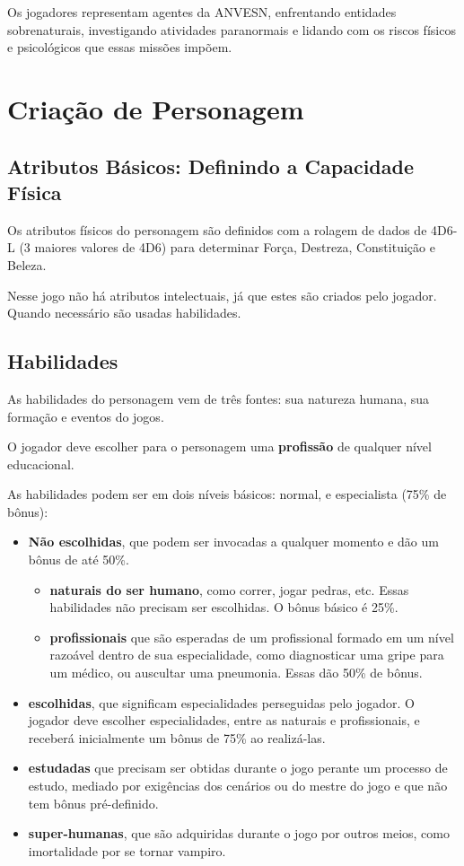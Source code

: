 \documentclass[a4paper,12pt]{book}
\begin{document}
Os jogadores representam agentes da ANVESN, enfrentando entidades sobrenaturais, investigando atividades paranormais e lidando com os riscos físicos e psicológicos que essas missões impõem.

\chapter{Criação de Personagem}

\section{Atributos Básicos: Definindo a Capacidade Física}

Os atributos físicos do personagem são definidos com a rolagem de dados de 4D6-L (3 maiores valores de 4D6) para determinar Força, Destreza, Constituição e Beleza.

Nesse jogo não há atributos intelectuais, já que estes são criados pelo jogador. Quando necessário são usadas habilidades.

\section{Habilidades}

As habilidades do personagem vem de três fontes: sua natureza humana, sua formação e eventos do jogos.

O jogador deve escolher para o personagem uma \textbf{profissão} de qualquer nível educacional.


As habilidades podem ser em dois níveis básicos: normal,   e especialista (75\% de bônus):

\begin{itemize}
\item \textbf{Não escolhidas}, que podem ser invocadas a qualquer momento e dão um bônus de até 50\%.
\begin{itemize}
\item \textbf{naturais do ser humano}, como correr, jogar pedras, etc. Essas habilidades não precisam ser escolhidas. O bônus básico é 25\%.
\item \textbf{profissionais} que são esperadas de um profissional formado em um nível razoável dentro de sua especialidade, como diagnosticar uma gripe para um médico, ou auscultar uma pneumonia. Essas dão 50\% de bônus.
\end{itemize}
\item \textbf{escolhidas}, que significam especialidades perseguidas pelo jogador. O jogador deve escolher  especialidades, entre as naturais e profissionais, e receberá inicialmente um bônus de 75\% ao realizá-las.
\item \textbf{estudadas} que precisam ser obtidas durante o jogo perante um processo de estudo, mediado por exigências dos cenários ou do mestre do jogo e que não tem bônus pré-definido.
\item \textbf{super-humanas}, que são adquiridas durante o jogo por outros meios, como imortalidade por se tornar vampiro.
\end{itemize}
\end{document}
